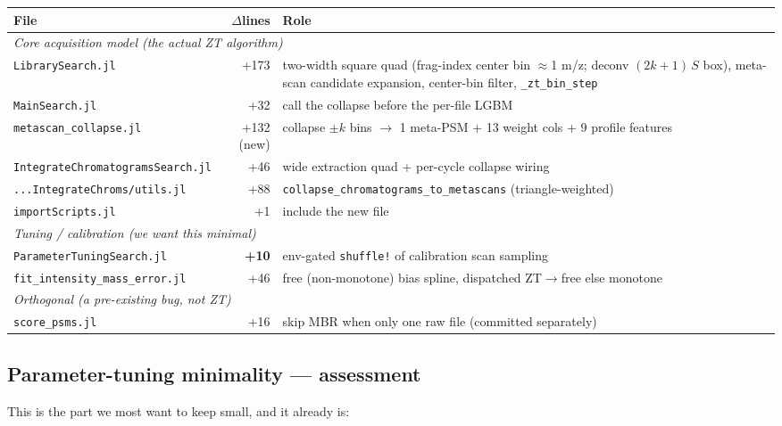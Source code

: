 \documentclass[11pt]{article}
\begin{document}
\begin{center}
\begin{tabular}{p{} r p{}}
\toprule
File & $\Delta$lines & Role \\
\midrule
\multicolumn{3}{l}{\textit{Core acquisition model (the actual ZT algorithm)}}\\
\texttt{LibrarySearch.jl} & +173 & two-width square quad (frag-index center bin
$\approx$1 m/z; deconv $(2k{+}1)\,S$ box), meta-scan candidate expansion,
center-bin filter, \texttt{\_zt\_bin\_step}\\
\texttt{MainSearch.jl} & +32 & call the collapse before the per-file LGBM\\
\texttt{metascan\_collapse.jl} & +132 (new) & collapse $\pm k$ bins $\to$ 1
meta-PSM + 13 weight cols + 9 profile features\\
\texttt{IntegrateChromatogramsSearch.jl} & +46 & wide extraction quad + per-cycle
collapse wiring\\
\texttt{...IntegrateChroms/utils.jl} & +88 & \texttt{collapse\_chromatograms\_to\_metascans} (triangle-weighted)\\
\texttt{importScripts.jl} & +1 & include the new file\\
\midrule
\multicolumn{3}{l}{\textit{Tuning / calibration (we want this minimal)}}\\
\texttt{ParameterTuningSearch.jl} & \textbf{+10} & env-gated \texttt{shuffle!} of
calibration scan sampling\\
\texttt{fit\_intensity\_mass\_error.jl} & +46 & free (non-monotone) bias spline,
dispatched ZT$\to$free else monotone\\
\midrule
\multicolumn{3}{l}{\textit{Orthogonal (a pre-existing bug, not ZT)}}\\
\texttt{score\_psms.jl} & +16 & skip MBR when only one raw file (committed
separately)\\
\bottomrule
\end{tabular}
\end{center}

\subsection{Parameter-tuning minimality --- assessment}

This is the part we most want to keep small, and it already is:
\end{document}
